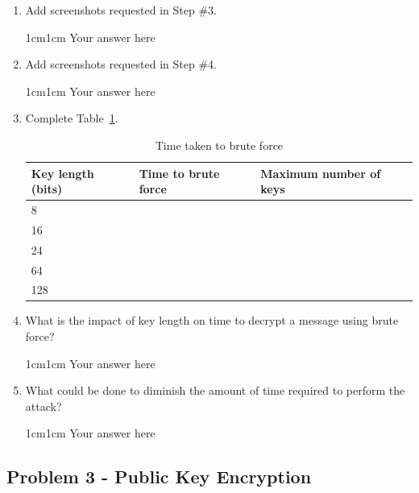 \documentclass[11pt,letterpaper]{article}
\newenvironment{answer}{\em \color{blue} \begin{adjustwidth}{1cm}{1cm}}{\end{adjustwidth}}
\begin{document}
	\begin{enumerate}
		\item Add screenshots requested in Step \#3.
		\begin{answer}
			Your answer here
		\end{answer}
		
		\item Add screenshots requested in Step \#4.
		\begin{answer}
			Your answer here
		\end{answer}
		\item Complete Table~\ref{tab:time-taken-to-bruteforce}.
		\begin{table}[h!]
			\caption{Time taken to brute force} \label{tab:time-taken-to-bruteforce}
			\begin{tabularx}{\columnwidth}{|p{4cm}|X|X|}
				\hline
				\textbf{Key length (bits)} & \textbf{Time to brute force} & \textbf{Maximum number of keys} \\
				\hline
				8 & & \\\hline
				
				\hline
				16 & & \\\hline
				
				\hline
				24 & & \\ \hline
				
				\hline
				64 & & \\ \hline
				
				\hline
				128 & & \\ \hline
				
			\end{tabularx}
		\end{table}
		\item What is the impact of key length on time to decrypt a message using brute force?
		\begin{answer}
			Your answer here
		\end{answer}
		\item What could be done to diminish the amount of time required to perform the attack?
		\begin{answer}
			Your answer here
		\end{answer}
		
	\end{enumerate}
	
	\subsection*{Problem 3 - Public Key Encryption}
	
\end{document}
